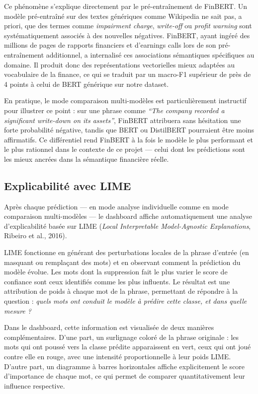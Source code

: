 \documentclass[12pt, a4paper]{article}
\begin{document}
Ce phénomène s'explique directement par le pré-entraînement de FinBERT. Un modèle
pré-entraîné sur des textes génériques comme Wikipedia ne sait pas, a priori, que
des termes comme \textit{impairment charge}, \textit{write-off} ou \textit{profit
warning} sont systématiquement associés à des nouvelles négatives. FinBERT, ayant
ingéré des millions de pages de rapports financiers et d'earnings calls lors de
son pré-entraînement additionnel, a internalisé ces associations sémantiques
spécifiques au domaine. Il produit donc des représentations vectorielles mieux
adaptées au vocabulaire de la finance, ce qui se traduit par un macro-F1 supérieur
de près de 4 points à celui de BERT générique sur notre dataset.

En pratique, le mode comparaison multi-modèles est particulièrement instructif pour
illustrer ce point : sur une phrase comme \textit{``The company recorded a significant
write-down on its assets''}, FinBERT attribuera sans hésitation une forte probabilité
négative, tandis que BERT ou DistilBERT pourraient être moins affirmatifs. Ce
différentiel rend FinBERT à la fois le modèle le plus performant et le plus
rationnel dans le contexte de ce projet --- celui dont les prédictions sont les mieux
ancrées dans la sémantique financière réelle.

\subsection{Explicabilité avec LIME}

Après chaque prédiction --- en mode analyse individuelle comme en mode comparaison
multi-modèles --- le dashboard affiche automatiquement une analyse d'explicabilité
basée sur LIME (\textit{Local Interpretable Model-Agnostic Explanations}, Ribeiro et al.,
2016).

LIME fonctionne en générant des perturbations locales de la phrase d'entrée
(en masquant ou remplaçant des mots) et en observant comment la prédiction du
modèle évolue. Les mots dont la suppression fait le plus varier le score de
confiance sont ceux identifiés comme les plus influents. Le résultat est une
attribution de poids à chaque mot de la phrase, permettant de répondre à la
question : \textit{quels mots ont conduit le modèle à prédire cette classe, et dans
quelle mesure ?}

Dans le dashboard, cette information est visualisée de deux manières complémentaires.
D'une part, un surlignage coloré de la phrase originale : les mots qui ont poussé
vers la classe prédite apparaissent en vert, ceux qui ont joué contre elle en rouge,
avec une intensité proportionnelle à leur poids LIME. D'autre part, un diagramme
à barres horizontales affiche explicitement le score d'importance de chaque mot,
ce qui permet de comparer quantitativement leur influence respective.
\end{document}
